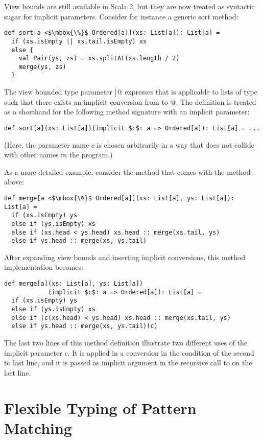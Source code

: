 \documentclass[a4paper,11pt,twoside]{article}
\begin{document}
View bounds are still available in Scala 2, but they are now treated as
syntactic sugar for implicit parameters. Consider for instance 
a generic sort method:
\begin{lstlisting}
def sort[a <$\mbox{\%}$ Ordered[a]](xs: List[a]): List[a] = 
  if (xs.isEmpty || xs.tail.isEmpty) xs
  else {
    val Pair(ys, zs) = xs.splitAt(xs.length / 2)
    merge(ys, zs)
  }
\end{lstlisting}
The view bounded type parameter \lstinline@[a <$\mbox{\%}$ Ordered[a]]@
expresses that \lstinline@sort@ is applicable to lists of type
\lstinline@a@ such that there exists an implicit conversion from
\lstinline@a@ to \lstinline@Ordered[a]@. The definition is treated as
a shorthand for the following method signature with an implicit
parameter:
\begin{lstlisting}
def sort[a](xs: List[a])(implicit $c$: a => Ordered[a]): List[a] = ...
\end{lstlisting}
(Here, the parameter name $c$ is chosen arbitrarily in a way
that does not collide with other names in the program.)

As a more detailed example, consider the \lstinline@merge@ method that
comes with the \lstinline@sort@ method above:
\begin{lstlisting}
def merge[a <$\mbox{\%}$ Ordered[a]](xs: List[a], ys: List[a]): List[a] =
  if (xs.isEmpty) ys
  else if (ys.isEmpty) xs
  else if (xs.head < ys.head) xs.head :: merge(xs.tail, ys)
  else if ys.head :: merge(xs, ys.tail)
\end{lstlisting}
After expanding view bounds and inserting implicit conversions, this
method implementation becomes:
\begin{lstlisting}
def merge[a](xs: List[a], ys: List[a])
            (implicit $c$: a => Ordered[a]): List[a] =
  if (xs.isEmpty) ys
  else if (ys.isEmpty) xs
  else if (c(xs.head) < ys.head) xs.head :: merge(xs.tail, ys)
  else if ys.head :: merge(xs, ys.tail)(c)
\end{lstlisting}
The last two lines of this method definition illustrate two different
uses of the implicit parameter $c$. It is applied in a conversion in
the condition of the second to last line, and it is passed as implicit
argument in the recursive call to \lstinline@merge@ on the last line.

\section{Flexible Typing of Pattern Matching}
\end{document}
